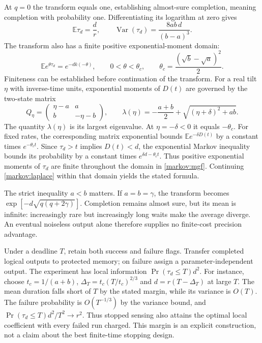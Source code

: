 \documentclass[11pt,a4paper]{article}
\numberwithin{equation}{section}
\theoremstyle{remark}
\begin{document}
At $q=0$ the transform equals one, establishing almost-sure completion,
meaning completion with probability one.
Differentiating its logarithm at zero gives
\begin{equation}
 \mathbb E\tau_d=\frac d r,\qquad
 \operatorname{Var}(\tau_d)=\frac{8ab\,d}{(b-a)^3}.
 \label{markov:moments}
\end{equation}
The transform also has a finite positive exponential-moment domain:
\begin{equation}
 \mathbb E e^{\theta\tau_d}=e^{-d k(-\theta)},\qquad
 0<\theta<\theta_c,\qquad
 \theta_c=\frac{(\sqrt b-\sqrt a)^2}{2}.
 \label{markov:mgf}
\end{equation}
Finiteness can be established before continuation of the transform. For a
real tilt $\eta$ with inverse-time units, exponential moments of $D(t)$ are
governed by the two-state matrix
\begin{equation}
 Q_\eta=\begin{pmatrix}\eta-a&a\\b&-\eta-b\end{pmatrix},\qquad
 \lambda(\eta)=-\frac{a+b}{2}+\sqrt{(\eta+\delta)^2+ab}.
\end{equation}
The quantity $\lambda(\eta)$ is its largest eigenvalue. At $\eta=-\delta<0$ it
equals $-\theta_c$. For fixed rates, the corresponding
matrix exponential bounds $\mathbb E e^{-\delta D(t)}$ by a constant times
$e^{-\theta_ct}$. Since $\tau_d>t$ implies $D(t)<d$, the exponential
Markov inequality bounds its probability by a constant times
$e^{\delta d-\theta_ct}$. Thus positive exponential moments of
$\tau_d$ are finite throughout the domain in \eqref{markov:mgf}. Continuing
\eqref{markov:laplace} within that domain yields the stated formula.

The strict inequality $a<b$ matters. If $a=b=\gamma$, the transform becomes
$\exp[-d\sqrt{q(q+2\gamma)}]$. Completion remains almost sure, but its mean
is infinite: increasingly rare but increasingly long waits make the average
diverge. An eventual noiseless output alone therefore supplies no
finite-cost precision advantage.

Under a deadline $T$, retain both success and failure flags. Transfer completed
logical outputs to protected memory; on failure assign a parameter-independent
output. The experiment has local information
$\Pr(\tau_d\le T)d^2$. For instance, choose $t_c=1/(a+b)$,
$\Delta_T=t_c(T/t_c)^{2/3}$ and $d=r(T-\Delta_T)$ at large $T$. The mean duration falls short of
$T$ by the stated margin, while its variance is $O(T)$. The failure probability
is $O(T^{-1/3})$ by the variance bound, and $\Pr(\tau_d\le T)d^2/T^2\to r^2$.
Thus stopped sensing also attains the optimal local coefficient with every
failed run charged. This margin is an explicit construction, not a claim about
the best finite-time stopping design.
\end{document}
